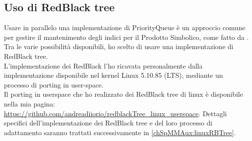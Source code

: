 \subsection{Uso di RedBlack tree} \label{chSpMMSymb:usoRBTree}
Usare in parallelo una implementazione di PriorityQueue è un approccio comune
per gestire il mantenimento degli indici \nnz per il Prodotto Simbolico, come fatto da \cite{SpMM_KNL_Multicore_symbsSols}.\\
Tra le varie possibilità disponibili, ho scelto di usare una implementazione di RedBlack tree.\\
\label{chSpMMSymb:usoRBTree}
L'implementazione dei RedBlack l'ho ricavata personalmente dalla implementazione disponibile nel kernel Linux 5.10.85 (LTS),
mediante un processo di porting in user-space.\\
Il porting in userspace che ho realizzato dei RedBlack tree di linux è disponibile nella mia pagina: \url{https://github.com/andreadiiorio/redblackTree_linux_userspace}.
Dettagli specifici dell'implementazione dei RedBlack tree e del loro processo di adattamento saranno trattati successivamente in \ref{chSpMMAux:linuxRBTree}.\\

